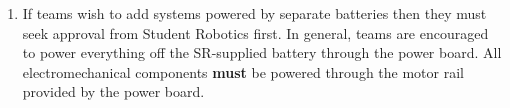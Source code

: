 \begin{enumerate}
\item If teams wish to add systems powered by separate batteries then they must seek approval from Student Robotics first.
 In general, teams are encouraged to power everything off the SR-supplied battery through the power board.
 All electromechanical components \textbf{must} be powered through the motor rail provided by the power board.

\end{enumerate}
